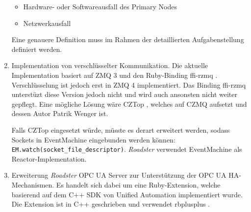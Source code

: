 \documentclass[a4paper]{article}
\newcommand{\rb}[1]{\lstinline[style=customruby]{#1}} %
\begin{document}
\begin{enumerate}
		\begin{itemize}
			\item Hardware- oder Softwareausfall des Primary Nodes
			\item Netzwerkausfall
		\end{itemize}

		Eine genauere Definition muss im Rahmen der detaillierten
		Aufgabenstellung definiert werden.


	\item Implementation von verschlüsselter Kommunikation. Die aktuelle
		Implementation basiert auf ZMQ 3 und den Ruby-Binding ffi-rzmq
		\cite{github:ffi-rzmq}.  Verschlüsselung ist jedoch erst in ZMQ
		4 implementiert. Das Binding ffi-rzmq unterstüzt diese Version
		jedoch nicht und wird auch ansonsten nicht weiter gepflegt.
		Eine mögliche Lösung wäre CZTop \cite{github:cztop}, welches
		auf CZMQ aufsetzt und dessen Autor Patrik Wenger ist.

		Falls CZTop eingesetzt würde, müsste es derart erweitert
		werden, sodass Sockets in EventMachine \cite{gem:eventmachine}
		eingebunden werden können:
		\rb{EM.watch(socket_file_descriptor)}. \emph{Roadster}
		verwendet EventMachine als Reactor-Implementation.


	\item Erweiterung \emph{Roadster} OPC UA Server zur Unterstützung der
		OPC UA HA-Mechanismen. Es handelt sich dabei um eine
		Ruby-Extension, welche basierend auf dem C++ SDK von Unified
		Automation \cite{ua-server-sdk} implementiert wurde. Die
		Extension ist in C++ geschrieben und verwendet rbplusplus
		\cite{github:rbplusplus}.
\end{enumerate}
\printbibliography
\end{document}

